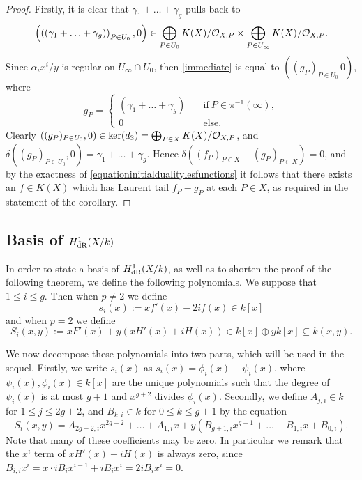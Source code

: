 \begin{proof}
    Firstly, it is clear that $\gamma_1 + \ldots + \gamma_g$ pulls back to 
        \begin{equation}\label{immediate}
        \left( \left(\left( \gamma_1 + \ldots + \gamma_g \right) \right)_{P \in U_0}, 0\right) \in \bigoplus_{P \in U_0}K(X)/{\cal O}_{X,P} \times \bigoplus_{P \in U_\infty}K(X)/{\cal O}_{X,P}.
        \end{equation}
    Since $\alpha_ix^i/y$ is regular on $U_\infty \cap U_0$, then \eqref{immediate} is equal to $\left( (g_P)_{P \in U_0}\, 0\right)$, where
        \[
        g_P =
            \begin{cases}
            \left( \gamma_1 + \ldots + \gamma_g \right) & \quad \text{if}\ P \in \pi^{-1}(\infty), \\
            0 & \quad \text{else.}
            \end{cases}
        \]
    Clearly $\left( (g_P)_{P \in U_0},0\right) \in \ker (d_3) = \bigoplus_{P \in X} K(X)/{\cal O}_{X,P}$, and $\delta \left( (g_P)_{P \in U_0}, 0 \right) = \gamma_1 + \ldots + \gamma_g$.
    Hence $\delta((f_P)_{P \in X} - (g_P)_{P \in X}) = 0$, and by the exactness of \eqref{equationinitialdualitylesfunctions} it follows that there exists an $f \in K(X)$ which has Laurent tail $f_P - g_P$ at each $P \in X$, as required in the statement of the corollary.
    \end{proof}

\subsection{Basis of $H^1_{\rm dR}(X/k)$}

In order to state a basis of $H_{\text {dR}}^1(X/k)$, as well as to shorten the proof of the following theorem, we define the following polynomials. 
We suppose that $1 \leq i \leq g$.
Then when $p\neq 2$ we define
    \[
    s_i(x) := xf'(x) - 2if(x) \in k[x]
    \]
and when $p = 2$ we define
    \begin{equation}\label{equationSi}
    S_i(x,y) := xF'(x) + y(xH'(x) + iH(x))\in k[x]\oplus yk[x] \subseteq k(x,y).
    \end{equation}

We now decompose these polynomials into two parts, which will be used in the sequel.
Firstly, we write $s_i(x)$ as $s_i(x) = \phi_i(x) + \psi_i(x)$, where $\psi_i(x), \phi_i(x) \in k[x]$ are the unique polynomials such that the degree of $\psi_i (x)$ is at most $g+1$ and $x^{g+2}$ divides $\phi_i(x)$.
Secondly, we define $A_{j,i} \in k$ for $1 \leq j \leq 2g+2$, and $B_{k,i} \in k$ for $0\leq k \leq g+1$ by the equation
    \[
    S_i(x,y) = A_{2g+2,i}x^{2g+2} + \ldots + A_{1,i} x + y(B_{g+1,i} x^{g+1} + \ldots + B_{1,i} x + B_{0,i}).
    \]
Note that many of these coefficients may be zero.
In particular we remark that the $x^i$ term of $xH'(x) + iH(x)$ is always zero, since $B_{i,i}x^i = x \cdot iB_ix^{i-1} + iB_i x^i = 2iB_ix^i = 0$.


